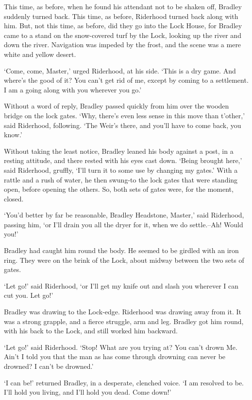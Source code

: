 This time, as before, when he found his attendant not to be shaken off,
Bradley suddenly turned back. This time, as before, Riderhood turned
back along with him. But, not this time, as before, did they go into the
Lock House, for Bradley came to a stand on the snow-covered turf by the
Lock, looking up the river and down the river. Navigation was impeded by
the frost, and the scene was a mere white and yellow desert.

‘Come, come, Master,’ urged Riderhood, at his side. ‘This is a dry game.
And where’s the good of it? You can’t get rid of me, except by coming to
a settlement. I am a going along with you wherever you go.’

Without a word of reply, Bradley passed quickly from him over the wooden
bridge on the lock gates. ‘Why, there’s even less sense in this move
than t’other,’ said Riderhood, following. ‘The Weir’s there, and you’ll
have to come back, you know.’

Without taking the least notice, Bradley leaned his body against a post,
in a resting attitude, and there rested with his eyes cast down. ‘Being
brought here,’ said Riderhood, gruffly, ‘I’ll turn it to some use by
changing my gates.’ With a rattle and a rush of water, he then swung-to
the lock gates that were standing open, before opening the others. So,
both sets of gates were, for the moment, closed.

‘You’d better by far be reasonable, Bradley Headstone, Master,’ said
Riderhood, passing him, ‘or I’ll drain you all the dryer for it, when we
do settle.--Ah! Would you!’

Bradley had caught him round the body. He seemed to be girdled with an
iron ring. They were on the brink of the Lock, about midway between the
two sets of gates.

‘Let go!’ said Riderhood, ‘or I’ll get my knife out and slash you
wherever I can cut you. Let go!’

Bradley was drawing to the Lock-edge. Riderhood was drawing away from
it. It was a strong grapple, and a fierce struggle, arm and leg. Bradley
got him round, with his back to the Lock, and still worked him backward.

‘Let go!’ said Riderhood. ‘Stop! What are you trying at? You can’t drown
Me. Ain’t I told you that the man as has come through drowning can never
be drowned? I can’t be drowned.’

‘I can be!’ returned Bradley, in a desperate, clenched voice. ‘I am
resolved to be. I’ll hold you living, and I’ll hold you dead. Come
down!’

